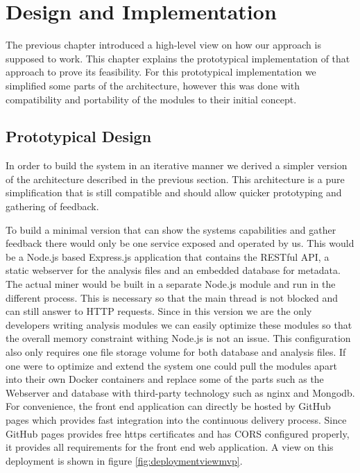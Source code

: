 \chapter{Design and Implementation} \label{chapDesign}
The previous chapter introduced a high-level view on how our approach is supposed to work. This chapter explains the prototypical implementation of that approach to prove its feasibility. For this prototypical implementation we simplified some parts of the architecture, however this was done with compatibility and portability of the modules to their initial concept.

\section{Prototypical Design} 
In order to build the system in an iterative manner we derived a simpler version of the architecture described in the previous section. This architecture is a pure simplification that is still compatible and should allow quicker prototyping and gathering of feedback. 

To build a minimal version that can show the systems capabilities and gather feedback there would only be one service exposed and operated by us. This would be a Node.js based Express.js application that contains the RESTful API, a static webserver for the analysis files and an embedded database for metadata. The actual miner would be built in a separate Node.js module and run in the different process. This is necessary so that the main thread is not blocked and can still answer to HTTP requests. Since in this version we are the only developers writing analysis modules we can easily optimize these modules so that the overall memory constraint withing Node.js is not an issue. This configuration also only requires one file storage volume for both database and analysis files. If one were to optimize and extend the system one could pull the modules apart into their own Docker containers and replace some of the parts such as the Webserver and database with third-party technology such as nginx and Mongodb.
For convenience, the front end application can directly be hosted by GitHub pages which provides fast integration into the continuous delivery process. Since GitHub pages provides free https certificates and has CORS configured properly, it provides all requirements for the front end web application. A view on this deployment is shown in figure \ref{fig:deploymentviewmvp}.

